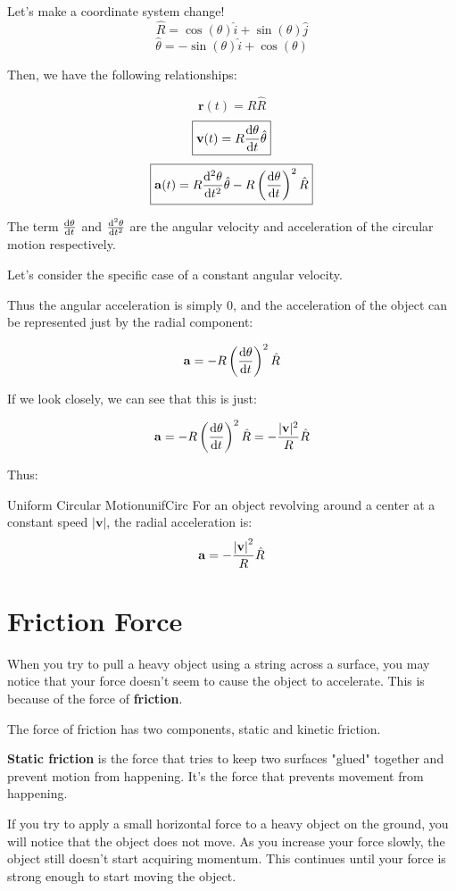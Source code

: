 \documentclass{report}
\begin{document}
Let's make a coordinate system change!
$$\hat{R} = \cos(\theta)\hat{i} + \sin(\theta)\hat{j}$$
$$\hat{\theta} = -\sin(\theta)\hat{i}+\cos{(\theta)}$$

Then, we have the following relationships:

$$
\boxed{
\mathbf{r}(t) = R\hat{R}
}
$$
$$
\boxed{
\mathbf{v}(t) = R\dv{\theta}{t} \hat{\theta}
}
$$
$$
\boxed{
\mathbf{a}(t) = R\dv[2]{\theta}{t} \hat{\theta} - R\left(\dv{\theta}{t}\right)^2 \hat{R}
}
$$

The term $\dv{\theta}{t}$ and $\dv[2]{\theta}{t}$ are the angular velocity and acceleration of the circular motion respectively.


Let's consider the specific case of a constant angular velocity.

Thus the angular acceleration is simply 0, and the acceleration of the object can be represented just by the radial component:

$$\mathbf{a} = -R\left(\dv{\theta}{t}\right)^2\hat{R}$$

If we look closely, we can see that this is just:

$$\mathbf{a} = -R\left(\dv{\theta}{t}\right)^2\hat{R} = -\frac{|\mathbf{v}|^2}{R}\hat{R}$$

Thus:
\begin{mytheo}{Uniform Circular Motion}{unifCirc}
    For an object revolving around a center at a constant speed $|\mathbf{v}|$, the radial acceleration is:
    $$\mathbf{a} = -\frac{\abs{\mathbf{v}}^2}{R}\hat{R}$$
\end{mytheo}

\section{Friction Force}
When you try to pull a heavy object using a string across a surface, you may notice that your force doesn't seem to cause the object to accelerate. This is because of the force of \textbf{friction}.

The force of friction has two components, static and kinetic friction.

\textbf{Static friction} is the force that tries to keep two surfaces "glued" together and prevent motion from happening. It's the force that prevents movement from happening.

If you try to apply a small horizontal force to a heavy object on the ground, you will notice that the object does not move. As you increase your force slowly, the object still doesn't start acquiring momentum. This continues until your force is strong enough to start moving the object.
\end{document}
